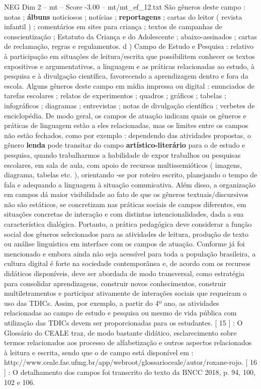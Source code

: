 \begin{textsample}{NEG Dim 2 – mt – Score -3.00 – mt/mt\_ef\_12.txt}
São gêneros deste campo : notas ; \textbf{álbuns} noticiosos ; notícias ; \textbf{reportagens} ; cartas do leitor ( revista infantil ) ; comentários em sites para criança ; textos de campanhas de conscientização ; Estatuto da Criança e do Adolescente ; abaixo-assinados ; cartas de reclamação, regras e regulamentos. d ) Campo de Estudo e Pesquisa : relativo à participação em situações de leitura/escrita que possibilitem conhecer os textos expositivos e argumentativos, a linguagem e as práticas relacionadas ao estudo, à pesquisa e à divulgação científica, favorecendo a aprendizagem dentro e fora da escola.
Alguns gêneros deste campo em mídia impressa ou digital : enunciados de tarefas escolares ; relatos de experimentos ; quadros ; gráficos ; tabelas ; infográficos ; diagramas ; entrevistas ; notas de divulgação científica ; verbetes de enciclopédia.
De modo geral, os campos de atuação indicam quais os gêneros e práticas de linguagem estão a eles relacionadas, mas os limites entre os campos não estão fechados, como por exemplo : dependendo das atividades propostas, o gênero \textbf{lenda} pode transitar do campo \textbf{artístico-literário} para o de estudo e pesquisa, quando trabalharmos a habilidade de expor trabalhos ou pesquisas escolares, em sala de aula, com apoio de recursos multissemióticos ( imagens, diagrama, tabelas etc. ), orientando -se por roteiro escrito, planejando o tempo de fala e adequando a linguagem à situação comunicativa.
Além disso, a organização em campos dá maior visibilidade ao fato de que os gêneros textuais/discursivos não são estáticos, se concretizam nas práticas sociais de campos diferentes, em situações concretas de interação e com distintas intencionalidades, dada a sua característica dialógica.
Portanto, a prática pedagógica deve considerar a função social dos gêneros selecionados para as atividades de leitura, produção de texto ou análise linguística em interface com os campos de atuação.
Conforme já foi mencionado e embora ainda não seja acessível para toda a população brasileira, a cultura digital é forte na sociedade contemporânea e, de acordo com os recursos didáticos disponíveis, deve ser abordada de modo transversal, como estratégia para consolidar aprendizagens, construir novos conhecimentos, construir multiletramentos e participar ativamente de interações sociais que requeiram o uso das TDICs.
Assim, por exemplo, a partir do 4º ano, as atividades relacionadas ao campo de estudo e pesquisa ou mesmo de vida pública com utilização das TDICs devem ser proporcionadas para os estudantes. [ 15 ] : O Glossário do CEALE traz, de modo bastante didático, esclarecimento sobre termos relacionados aos processo de alfabetização e outros aspectos relacionados à leitura e escrita, sendo que o de campo está disponível em : http://www.ceale.fae.ufmg.br/app/webroot/glossarioceale/autor/roxane-rojo. [ 16 ] : O detalhamento dos campos foi transcrito do texto da BNCC 2018, p. 94, 100, 102 e 106.

\end{textsample}
